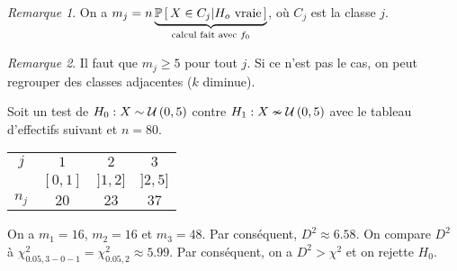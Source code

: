 \documentclass[11pt]{article}
\newcommand\Pg[2]{%
	\ensuremath{%
		\mathbb{P}\left[\,#1\middle\rvert#2\,\right]%
	}%
}%
\newcommand\Uni[2]{%
	\ensuremath{%
		\mathcal{U}\left(#1,#2\right)%
	}%
}%
\theoremstyle{remark}
\newtheorem*{remark}{Remarque}
\theoremstyle{definition}
\begin{document}
\begin{remark}
	On a $m_j=n\underbrace{\Pg{X\in C_j}{H_o\text{ vraie}}}_{\text{calcul fait
	avec $f_0$}}$, où $C_j$ est la classe $j$.
\end{remark}

\begin{remark}
	Il faut que $m_j\geq 5$ pour tout $j$. Si ce n'est pas le cas, on peut
	regrouper des classes adjacentes ($k$ diminue).
\end{remark}

\begin{exemple}
	Soit un test de $H_0:X\sim\Uni{0}{5}$ contre $H_1:X\nsim\Uni{0}{5}$ avec le
	tableau d'effectifs suivant et $n=80$.
	\begin{table}[H]
		\centering
		\begin{tabular}{c|ccc}
			\toprule
			$j$   & $1$     & $2$     & $3$\\
                  & $[0,1]$ & $]1,2]$ & $]2,5]$\\
			\midrule
			$n_j$ & $20$    & $23$    & $37$\\
			\bottomrule
		\end{tabular}
	\end{table}

	On a $m_1=16$, $m_2=16$ et $m_3=48$. Par conséquent, $D^2\approx 6.58$. On
	compare $D^2$ à $\chi^2_{0.05,3-0-1}=\chi^2_{0.05,2}\approx 5.99$. Par
	conséquent, on a $D^2>\chi^2$ et on rejette $H_0$.
\end{exemple}
\end{document}
